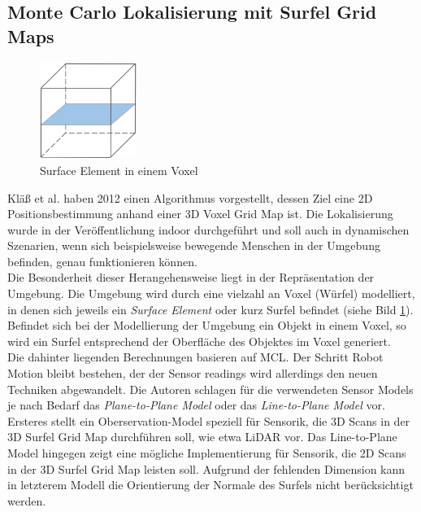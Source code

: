 \subsection{Monte Carlo Lokalisierung mit Surfel Grid Maps}\label{subsec:mcl_surfel}
\begin{figure}
    \centering
    \includegraphics[width=0.28\textwidth]{pic/loesungen/12_surfel.png}
    \caption{Surface Element in einem Voxel}
    \label{fig:surfel}
\end{figure}
Kläß et al. \cite{3DsurfelGridMaps} haben 2012 einen Algorithmus vorgestellt, dessen Ziel eine 2D Positionsbestimmung anhand einer 3D Voxel Grid Map ist. Die Lokalisierung wurde in der Veröffentlichung indoor durchgeführt und soll auch in dynamischen Szenarien, wenn sich beispielsweise bewegende Menschen in der Umgebung befinden, genau funktionieren können.\\
Die Besonderheit dieser Herangehensweise liegt in der Repräsentation der Umgebung. Die Umgebung wird durch eine vielzahl an Voxel (Würfel) modelliert, in denen sich jeweils ein \textit{Surface Element} oder kurz Surfel befindet (siehe Bild \ref{fig:surfel}). Befindet sich bei der Modellierung der Umgebung ein Objekt in einem Voxel, so wird ein Surfel entsprechend der Oberfläche des Objektes im Voxel generiert.\\
Die dahinter liegenden Berechnungen basieren auf MCL. Der Schritt Robot Motion bleibt bestehen, der der Sensor readings wird allerdings den neuen Techniken abgewandelt. Die Autoren schlagen für die verwendeten Sensor Models je nach Bedarf das \textit{Plane-to-Plane Model} oder das \textit{Line-to-Plane Model} vor. Ersteres stellt ein Oberservation-Model speziell für Sensorik, die 3D Scans in der 3D Surfel Grid Map durchführen soll, wie etwa LiDAR vor. Das Line-to-Plane Model hingegen zeigt eine mögliche Implementierung für Sensorik, die 2D Scans in der 3D Surfel Grid Map leisten soll. Aufgrund der fehlenden Dimension kann in letzterem Modell die Orientierung der Normale des Surfels nicht berücksichtigt werden.\\
